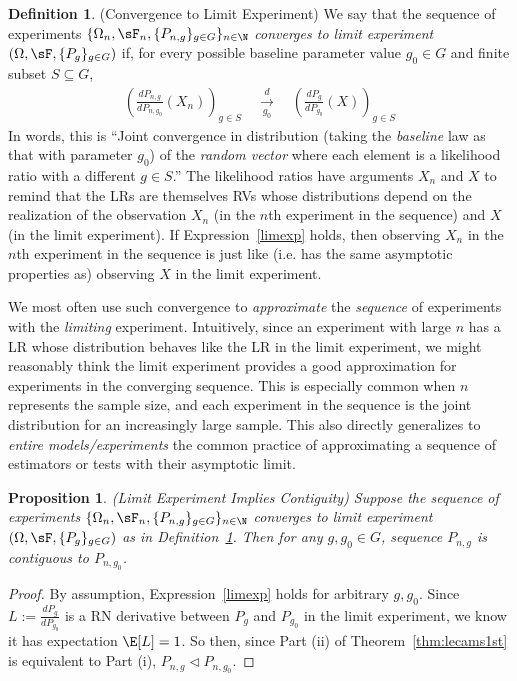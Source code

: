 \documentclass[12pt]{article}
\theoremstyle{plain}
\newtheorem{prop}[thm]{Proposition}
\theoremstyle{definition}
\newtheorem{defn}[thm]{Definition}
\theoremstyle{remark}
\newcommand{\dto}{\xrightarrow{d}}
\begin{document}
\begin{defn}(Convergence to Limit Experiment)
\label{defn:limitexp}
We say that the sequence of experiments
$\{\Omega_n,\sF_n,\{P_{n,g}\}_{g\in G}\}_{n\in\N}$
\emph{converges to limit experiment}
$(\Omega,\sF,\{P_{g}\}_{g\in G})$ if,
for every possible baseline parameter value $g_0\in G$ and
finite subset $S\subseteq  G$,
\begin{align}
  \left(
  \frac{dP_{n,g}}{dP_{n,g_0}}(X_n)
  \right)_{g\in S}
  \quad\underset{g_0}{\dto}\quad
  \left(
  \frac{dP_{g}}{dP_{g_0}}(X)
  \right)_{g\in S}
  \label{limexp}
\end{align}
In words, this is ``Joint convergence in distribution
(taking the \emph{baseline} law as that with parameter $g_0$)
of the \emph{random vector} where each element is a likelihood ratio
with a different $g\in S$.''
The likelihood ratios have arguments $X_n$ and $X$ to remind that the
LRs are themselves RVs whose distributions depend on the realization of
the observation $X_n$ (in the $n$th experiment in the sequence) and $X$
(in the limit experiment).
If Expression~\ref{limexp} holds, then observing $X_n$ in the $n$th
experiment in the sequence is just like (i.e. has the same asymptotic
properties as) observing $X$ in the limit experiment.

We most often use such convergence to \emph{approximate} the
\emph{sequence} of experiments with the \emph{limiting} experiment.
Intuitively, since an experiment with large $n$ has a LR whose
distribution behaves like the LR in the limit experiment, we might
reasonably think the limit experiment provides a good approximation for
experiments in the converging sequence.
This is especially common when $n$ represents the sample size, and each
experiment in the sequence is the joint distribution for an increasingly
large sample.
This also directly generalizes to \emph{entire models/experiments} the
common practice of approximating a sequence of estimators or tests with
their asymptotic limit.
\end{defn}

\begin{prop}\emph{(Limit Experiment Implies Contiguity)}
\label{prop:impcontiguity}
Suppose the sequence of experiments
$\{\Omega_n,\sF_n,\{P_{n,g}\}_{g\in G}\}_{n\in\N}$
converges to limit experiment $(\Omega,\sF,\{P_{g}\}_{g\in G})$
as in Definition~\ref{defn:limitexp}.
Then for any $g,g_0\in G$,
sequence $P_{n,g}$ is contiguous to $P_{n,g_0}$.
\end{prop}
\begin{proof}
By assumption, Expression~\ref{limexp} holds for arbitrary $g,g_0$.
Since $L:=\frac{dP_g}{dP_{g_0}}$ is a RN derivative between $P_{g}$ and
$P_{g_0}$ in the limit experiment, we know it has expectation $\E[L]=1$.
So then, since Part (ii) of Theorem~\ref{thm:lecams1st} is equivalent to
Part (i), $P_{n,g}\vartriangleleft P_{n,g_0}$.
\end{proof}
\end{document}
